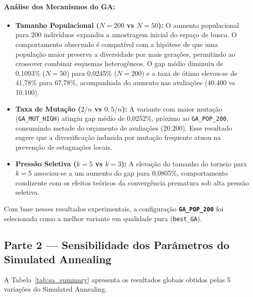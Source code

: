 \documentclass[12pt]{article}
\begin{document}
\paragraph{Análise dos Mecanismos do GA:}
\begin{itemize}
    \item \textbf{Tamanho Populacional ($N=200$ vs $N=50$):} O aumento populacional para 200 indivíduos expandiu a amostragem inicial do espaço de busca. O comportamento observado é compatível com a hipótese de que uma população maior preserva a diversidade por mais gerações, permitindo ao crossover combinar esquemas heterogêneos. O gap médio diminuiu de 0,1093\% ($N=50$) para 0,0245\% ($N=200$) e a taxa de ótimo elevou-se de 41,78\% para 67,78\%, acompanhada do aumento nas avaliações (40.400 vs 10.100).
    \item \textbf{Taxa de Mutação ($2/n$ vs $0,5/n$):} A variante com maior mutação (\texttt{GA\_MUT\_HIGH}) atingiu gap médio de 0,0252\%, próximo ao \texttt{GA\_POP\_200}, consumindo metade do orçamento de avaliações (20.200). Esse resultado sugere que a diversificação induzida por mutação frequente atuou na prevenção de estagnações locais.
    \item \textbf{Pressão Seletiva ($k=5$ vs $k=3$):} A elevação do tamanho do torneio para $k=5$ associou-se a um aumento do gap para 0,0805\%, comportamento condizente com os efeitos teóricos da convergência prematura sob alta pressão seletiva.
\end{itemize}

Com base nesses resultados experimentais, a configuração \textbf{\texttt{GA\_POP\_200}} foi selecionada como a melhor variante em qualidade pura (\texttt{best\_GA}).

\subsection{Parte 2 — Sensibilidade dos Parâmetros do Simulated Annealing}

A Tabela~\ref{tab:sa_summary} apresenta os resultados globais obtidos pelas 5 variações do Simulated Annealing.
\end{document}
